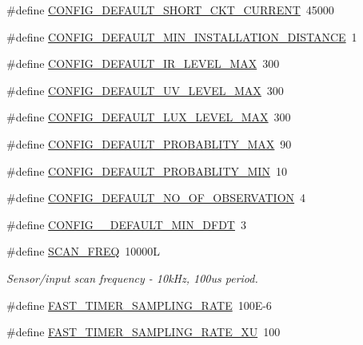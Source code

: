 \begin{DoxyCompactItemize}
\item 
\#define \hyperlink{a00021_a9b142f2e7d26511af74c411c0e524384}{C\+O\+N\+F\+I\+G\+\_\+\+D\+E\+F\+A\+U\+L\+T\+\_\+\+S\+H\+O\+R\+T\+\_\+\+C\+K\+T\+\_\+\+C\+U\+R\+R\+E\+N\+T}~45000
\item 
\#define \hyperlink{a00021_aad4ef21bb535ed8bbba5a4f2d0451711}{C\+O\+N\+F\+I\+G\+\_\+\+D\+E\+F\+A\+U\+L\+T\+\_\+\+M\+I\+N\+\_\+\+I\+N\+S\+T\+A\+L\+L\+A\+T\+I\+O\+N\+\_\+\+D\+I\+S\+T\+A\+N\+C\+E}~1
\item 
\#define \hyperlink{a00021_adf882de105367de21f0cbfe4490a046f}{C\+O\+N\+F\+I\+G\+\_\+\+D\+E\+F\+A\+U\+L\+T\+\_\+\+I\+R\+\_\+\+L\+E\+V\+E\+L\+\_\+\+M\+A\+X}~300
\item 
\#define \hyperlink{a00021_a29f761c18bae89d087200e4f1891c651}{C\+O\+N\+F\+I\+G\+\_\+\+D\+E\+F\+A\+U\+L\+T\+\_\+\+U\+V\+\_\+\+L\+E\+V\+E\+L\+\_\+\+M\+A\+X}~300
\item 
\#define \hyperlink{a00021_a04ab25767fbb61ec61784da889ec8c09}{C\+O\+N\+F\+I\+G\+\_\+\+D\+E\+F\+A\+U\+L\+T\+\_\+\+L\+U\+X\+\_\+\+L\+E\+V\+E\+L\+\_\+\+M\+A\+X}~300
\item 
\#define \hyperlink{a00021_a96cf926b530a1d5968881620d2f10445}{C\+O\+N\+F\+I\+G\+\_\+\+D\+E\+F\+A\+U\+L\+T\+\_\+\+P\+R\+O\+B\+A\+B\+L\+I\+T\+Y\+\_\+\+M\+A\+X}~90
\item 
\#define \hyperlink{a00021_a599be42d4b357badb7c9b16a124a186a}{C\+O\+N\+F\+I\+G\+\_\+\+D\+E\+F\+A\+U\+L\+T\+\_\+\+P\+R\+O\+B\+A\+B\+L\+I\+T\+Y\+\_\+\+M\+I\+N}~10
\item 
\#define \hyperlink{a00021_af69b35a9f07bfcfe500538565d898c65}{C\+O\+N\+F\+I\+G\+\_\+\+D\+E\+F\+A\+U\+L\+T\+\_\+\+N\+O\+\_\+\+O\+F\+\_\+\+O\+B\+S\+E\+R\+V\+A\+T\+I\+O\+N}~4
\item 
\#define \hyperlink{a00021_a0eae7c540b766617bb00f79cd63415a2}{C\+O\+N\+F\+I\+G\+\_\+\+\_\+\+D\+E\+F\+A\+U\+L\+T\+\_\+\+M\+I\+N\+\_\+\+D\+F\+D\+T}~3
\item 
\#define \hyperlink{a00021_a8127170b687c1f67a968886c128e76e4}{S\+C\+A\+N\+\_\+\+F\+R\+E\+Q}~10000\+L
\begin{DoxyCompactList}\small\item\em Sensor/input scan frequency -\/ 10k\+Hz, 100us period. \end{DoxyCompactList}\item 
\#define \hyperlink{a00021_a3a4dcb8af26a561d90607a41a3745806}{F\+A\+S\+T\+\_\+\+T\+I\+M\+E\+R\+\_\+\+S\+A\+M\+P\+L\+I\+N\+G\+\_\+\+R\+A\+T\+E}~100\+E-\/6
\item 
\#define \hyperlink{a00021_a87ea9a0eaa474d8b8f672cfa5cbb091f}{F\+A\+S\+T\+\_\+\+T\+I\+M\+E\+R\+\_\+\+S\+A\+M\+P\+L\+I\+N\+G\+\_\+\+R\+A\+T\+E\+\_\+\+X\+U}~100

\end{DoxyCompactItemize}
